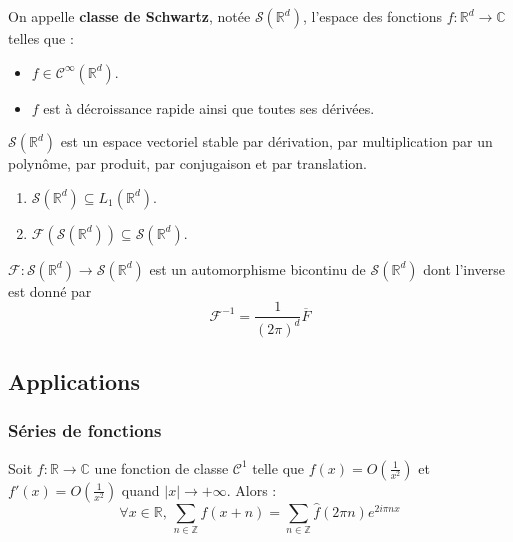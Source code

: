   \begin{definition}
    On appelle \textbf{classe de Schwartz}, notée $\mathcal{S}(\mathbb{R}^d)$, l'espace des fonctions $f : \mathbb{R}^d \rightarrow \mathbb{C}$ telles que :
    \begin{itemize}
      \item $f \in \mathcal{C}^\infty(\mathbb{R}^d)$.
      \item $f$ est à décroissance rapide ainsi que toutes ses dérivées.
    \end{itemize}
  \end{definition}

  \begin{proposition}
    $\mathcal{S}(\mathbb{R}^d)$ est un espace vectoriel stable par dérivation, par multiplication par un polynôme, par produit, par conjugaison et par translation.
  \end{proposition}

  \begin{theorem}
    \begin{enumerate}[label={\bfseries(\roman*)}]
      \item $\mathcal{S}(\mathbb{R}^d) \subseteq L_1(\mathbb{R}^d)$.
      \item $\mathcal{F}(\mathcal{S}(\mathbb{R}^d)) \subseteq \mathcal{S}(\mathbb{R}^d)$.
    \end{enumerate}
  \end{theorem}

  \begin{theorem}
    $\mathcal{F} : \mathcal{S}(\mathbb{R}^d) \rightarrow \mathcal{S}(\mathbb{R}^d)$ est un automorphisme bicontinu de $\mathcal{S}(\mathbb{R}^d)$ dont l'inverse est donné par
    \[ \mathcal{F}^{-1} = \frac{1}{(2 \pi)^d} \overline{F} \]
  \end{theorem}

  \subsection{Applications}

  \subsubsection{Séries de fonctions}


  \begin{theorem}
    Soit $f : \mathbb{R} \rightarrow \mathbb{C}$ une fonction de classe $\mathcal{C}^1$ telle que $f(x) = O \left( \frac{1}{x^2} \right)$ et $f'(x) = O \left( \frac{1}{x^2} \right)$ quand $|x| \longrightarrow +\infty$. Alors :
    \[ \forall x \in \mathbb{R}, \, \sum_{n \in \mathbb{Z}} f(x+n) = \sum_{n \in \mathbb{Z}} \widehat{f}(2 \pi n) e^{2 i \pi n x} \]
  \end{theorem}

